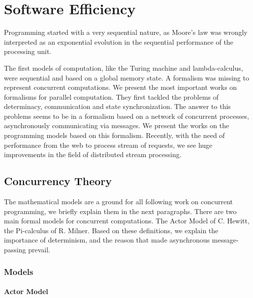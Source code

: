 \section{Software Efficiency} \label{chapter3:software-efficiency}

Programming started with a very sequential nature, as Moore's law \cite{Moore1965} was wrongly interpreted as an exponential evolution in the sequential performance of the processing unit.

The first models of computation, like the Turing machine and lambda-calculus, were sequential and based on a global memory state.
A formalism was missing to represent concurrent computations.
We present the most important works on formalisms for parallel computation.
They first tackled the problems of determinacy, communication and state synchronization.
The answer to this problems seems to be in a formalism based on a network of concurrent processes, asynchronously communicating via messages.
We present the works on the programming models based on this formalism.
Recently, with the need of performance from the web to process stream of requests, we see huge improvements in the field of distributed stream processing.

\subsection{Concurrency Theory} \label{chapter3:parallel-execution:concurrency-theory}

The mathematical models are a ground for all following work on concurrent programming, we briefly explain them in the next paragraphs.
There are two main formal models for concurrent computations.
The Actor Model of C. Hewitt, the Pi-calculus of R. Milner.
Based on these definitions, we explain the importance of determinism, and the reason that made asynchronous message-passing prevail.


\subsubsection{Models}

\paragraph{Actor Model}

